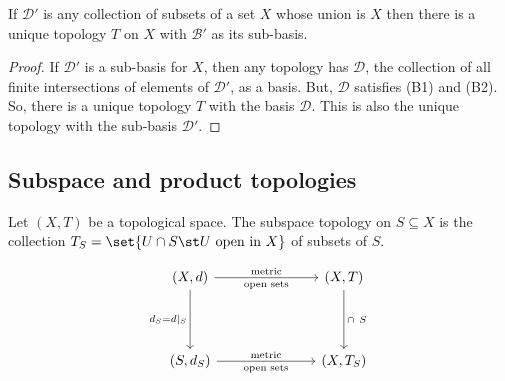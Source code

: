 \begin{nprop}
  If $\mathcal{D}'$ is any collection of subsets of a set $X$ whose union is $X$ then there is a unique topology $T$ on $X$ with $\mathcal{B}'$ as its sub-basis.
\end{nprop}
\begin{proof}
  If $\mathcal{D}'$ is a sub-basis for $X$, then any topology has $\mathcal{D}$, the collection of all finite intersections of elements of $\mathcal{D}'$, as a basis. But, $\mathcal{D}$ satisfies (B1) and (B2). So, there is a unique topology $T$ with the basis $\mathcal{D}$. This is also the unique topology with the sub-basis $\mathcal{D}'$.
\end{proof}

\subsection{Subspace and product topologies}
\begin{ndfn}
  Let $(X,T)$ be a topological space. The subspace topology on $S \subseteq X$ is the collection $T_S = \set{U \cap S \st U \text{ open in } X}$ of subsets of $S$.
\end{ndfn}
\begin{equation*}
\begin{tikzcd}[column sep=25mm, row sep=15mm]
(X,d) \arrow[r, "\text{metric}", "\text{open sets}" swap] \arrow[d, "d_S = d|_{S}" swap] & (X,T) \arrow[d, "\cap\ S"] \\
(S,d_S) \arrow[r, "\text{metric}", "\text{open sets}" swap] & (X,T_S)
\end{tikzcd}
\end{equation*}

